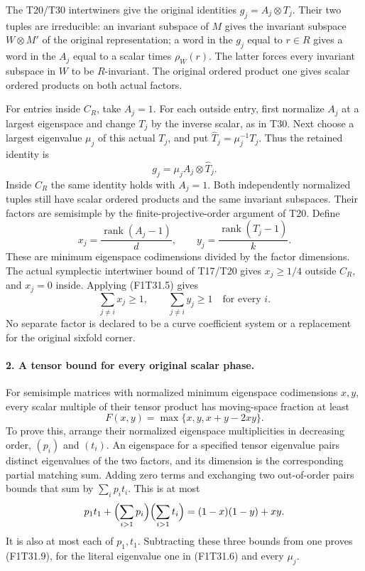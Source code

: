 The T20/T30 intertwiners give the original identities
\(g_j=A_j\otimes T_j\). Their two tuples are irreducible:
an invariant subspace of \(M\) gives the invariant subspace
\(W\otimes M'\) of the original representation; a word in
the \(g_j\) equal to \(r\in R\) gives a word in the
\(A_j\) equal to a scalar times \(\rho_W(r)\).
The latter forces every invariant subspace in \(W\) to
be \(R\)-invariant. The original ordered product one gives
scalar ordered products on both actual factors.

For entries inside \(C_R\), take \(A_j=1\).
For each outside entry, first normalize \(A_j\) at a
largest eigenspace and change \(T_j\) by the inverse
scalar, as in T30. Next choose a largest eigenvalue
\(\mu_j\) of this actual \(T_j\), and put
\(\widehat T_j=\mu_j^{-1}T_j\). Thus the retained identity is
\[
                 g_j=\mu_j A_j\otimes\widehat T_j.
 \tag{F1T31.6}
\]
Inside \(C_R\) the same identity holds with \(A_j=1\).
Both independently normalized tuples still have scalar
ordered products and the same invariant subspaces. Their
factors are semisimple by the finite-projective-order
argument of T20. Define
\[
 x_j=\frac{\operatorname{rank}(A_j-1)}d,
 \qquad
 y_j=\frac{\operatorname{rank}(\widehat T_j-1)}k.
 \tag{F1T31.7}
\]
These are minimum eigenspace codimensions divided by the
factor dimensions. The actual symplectic intertwiner bound
of T17/T20 gives \(x_j\ge1/4\) outside \(C_R\), and
\(x_j=0\) inside. Applying (F1T31.5) gives
\[
 \sum_{j\ne i}x_j\ge1,
 \qquad \sum_{j\ne i}y_j\ge1
                  \quad\text{for every }i.
 \tag{F1T31.8}
\]
No separate factor is declared to be a curve coefficient
system or a replacement for the original sixfold corner.

\paragraph{2. A tensor bound for every original scalar phase.}
For semisimple matrices with normalized minimum eigenspace
codimensions \(x,y\), every scalar multiple of their
tensor product has moving-space fraction at least
\[
       F(x,y)=\max\{x,y,x+y-2xy\}.
 \tag{F1T31.9}
\]
To prove this, arrange their normalized eigenspace
multiplicities in decreasing order, \((p_i)\) and \((t_i)\).
An eigenspace for a specified tensor eigenvalue pairs
distinct eigenvalues of the two factors, and its dimension
is the corresponding partial matching sum. Adding zero
terms and exchanging two out-of-order pairs bounds that
sum by \(\sum_i p_it_i\). This is at most
\[
 p_1t_1+\Bigl(\sum_{i>1}p_i\Bigr)
                   \Bigl(\sum_{i>1}t_i\Bigr)
       =(1-x)(1-y)+xy.
\]
It is also at most each of \(p_1,t_1\). Subtracting
these three bounds from one proves (F1T31.9), for the
literal eigenvalue one in (F1T31.6) and every \(\mu_j\).

